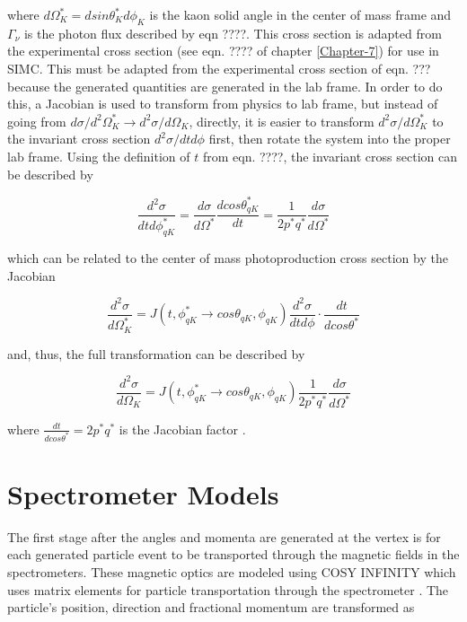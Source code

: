 \documentclass[
]{report}
\begin{document}
\noindent where \(d\Omega^*_{K}=dsin\theta^*_Kd\phi_K\) is the kaon
solid angle in the center of mass frame and \(\Gamma_{\nu}\) is the
photon flux described by eqn ????. This cross section is adapted from
the experimental cross section (see eqn. ???? of chapter
\ref{Chapter-7}) for use in SIMC. This must be adapted from the
experimental cross section of eqn. ??? because the generated quantities
are generated in the lab frame. In order to do this, a Jacobian is used
to transform from physics to lab frame, but instead of going from
\(d\sigma/d^2\Omega^*_K\rightarrow d^2\sigma/d\Omega_K\), directly, it
is easier to transform \(d^2\sigma/d\Omega^*_K\) to the invariant cross
section \(d^2\sigma/dtd\phi\) first, then rotate the system into the
proper lab frame. Using the definition of \(t\) from eqn. ????, the
invariant cross section can be described by

\begin{equation} 
  \frac{d^2\sigma}{dt d\phi^*_{qK}}=\frac{d\sigma}{d\Omega^*}\frac{d cos\theta^*_{qK}}{dt}=\frac{1}{2p^*q^*}\frac{d\sigma}{d\Omega^*}
  \label{eq:sig_ordertwo_tphi} 
\end{equation}

which can be related to the center of mass photoproduction cross section
by the Jacobian

\begin{equation} 
  \frac{d^2\sigma}{d\Omega^*_K}=J(t,\phi^*_{qK}\rightarrow cos\theta_{qK},\phi_{qK})\frac{d^2\sigma}{dtd\phi}\cdot\frac{dt}{d cos\theta^*}
  \label{eq:sig_ordertwo_virtual_physics} 
\end{equation}

\noindent and, thus, the full transformation can be described by

\begin{equation} 
  \frac{d^2\sigma}{d\Omega_K}=J(t,\phi^*_{qK}\rightarrow cos\theta_{qK},\phi_{qK})\frac{1}{2p^*q^*}\frac{d\sigma}{d\Omega^*}
  \label{eq:sig_ordertwo_virtual_lab} 
\end{equation}

\noindent where \(\frac{dt}{d cos\theta^*}=2p^*q^*\) is the Jacobian
factor \cite{gaskell_longitudinal_2001}.

\hypertarget{Section-6.3}{%
\section{Spectrometer Models}\label{Section-6.3}}

The first stage after the angles and momenta are generated at the vertex
is for each generated particle event to be transported through the
magnetic fields in the spectrometers. These magnetic optics are modeled
using COSY INFINITY which uses matrix elements for particle
transportation through the spectrometer \cite{berz_code_1991}. The
particle's position, direction and fractional momentum are transformed
as
\end{document}
